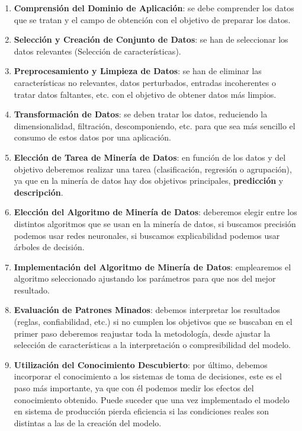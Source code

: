 \begin{enumerate}
    \item \textbf{Comprensión del Dominio de Aplicación}: se debe comprender los datos que se tratan y el campo de obtención con el objetivo de preparar los datos.
    \item \textbf{Selección y Creación de Conjunto de Datos}: se han de seleccionar los datos relevantes (Selección de características).
    \item \textbf{Preprocesamiento y Limpieza de Datos}: se han de eliminar las características no relevantes, datos perturbados, entradas incoherentes o tratar datos faltantes, etc. con el objetivo de obtener datos más limpios.
    \item \textbf{Transformación de Datos}: se deben tratar los datos, reduciendo la dimensionalidad, filtración, descomponiendo, etc. para que sea más sencillo el consumo de estos datos por una aplicación.
    \item \textbf{Elección de Tarea de Minería de Datos}: en función de los datos y del objetivo deberemos realizar una tarea (clasificación, regresión o agrupación), ya que en la minería de datos hay dos objetivos principales, \textbf{predicción} y \textbf{descripción}.
    \item \textbf{Elección del Algoritmo de Minería de Datos}: deberemos elegir entre los distintos algoritmos que se usan en la minería de datos, si buscamos precisión podemos usar redes neuronales, si buscamos explicabilidad podemos usar árboles de decisión.
    \item \textbf{Implementación del Algoritmo de Minería de Datos}: emplearemos el algoritmo seleccionado ajustando los parámetros para que nos del mejor resultado.
    \item \textbf{Evaluación de Patrones Minados}: debemos interpretar los resultados (reglas, confiabilidad, etc.) si no cumplen los objetivos que se buscaban en el primer paso deberemos reajustar toda la metodología, desde ajustar la selección de características a la interpretación o compresibilidad del modelo.
    \item \textbf{Utilización del Conocimiento Descubierto}: por último, debemos incorporar el conocimiento a los sistemas de toma de decisiones, este es el paso más importante, ya que con él podemos medir los efectos del conocimiento obtenido. Puede suceder que una vez implementado el modelo en sistema de producción pierda eficiencia si las condiciones reales son distintas a las de la creación del modelo.
\end{enumerate}



